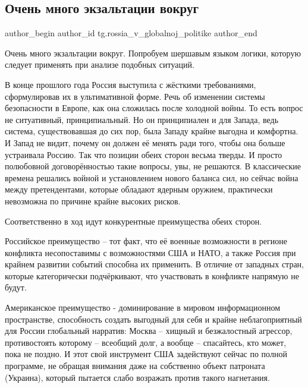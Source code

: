  
 
 
 
 
 
\subsection{Очень много экзальтации вокруг}
\label{sec:12_02_2022.tg.rossia_v_globalnoj_politike.1.ekzaltacia}
 
\ifcmt
 author_begin
   author_id tg.rossia_v_globalnoj_politike
 author_end
\fi

Очень много экзальтации вокруг. Попробуем шершавым языком логики, которую
следует применять при анализе подобных ситуаций. 

В конце прошлого года Россия выступила с жёсткими требованиями, сформулировав
их в ультимативной форме. Речь об изменении системы безопасности в Европе, как
она сложилась после холодной войны. То есть вопрос не ситуативный,
принципиальный. Но он принципиален и для Запада, ведь система, существовавшая
до сих пор, была Западу крайне выгодна и комфортна. И Запад не видит, почему он
должен её менять ради того, чтобы она больше устраивала Россию. Так что позиции
обеих сторон весьма тверды. И просто полюбовной договорённостью такие вопросы,
увы, не решаются. В классические времена решались войной и установлением нового
баланса сил, но сейчас война между претендентами, которые обладают ядерным
оружием, практически невозможна по причине крайне высоких рисков. 

Соответственно в ход идут конкурентные преимущества обеих сторон. 

Российское преимущество –  тот факт, что её военные возможности в регионе
конфликта несопоставимы с возможностями США и НАТО, а также Россия при крайнем
развитии событий способна их применить. В отличие от западных стран, которые
категорически подчёркивают, что участвовать в конфликте напрямую не будут. 

Американское преимущество - доминирование в мировом информационном
пространстве, способность создать выгодный для себя и крайне неблагоприятный
для России глобальный нарратив: Москва – хищный и безжалостный агрессор,
противостоять которому – всеобщий долг, а вообще – спасайтесь, кто может, пока
не поздно. И этот свой инструмент США задействуют сейчас по полной программе,
не обращая внимания даже на собственно объект патроната (Украина), который
пытается слабо возражать против такого нагнетания. 

